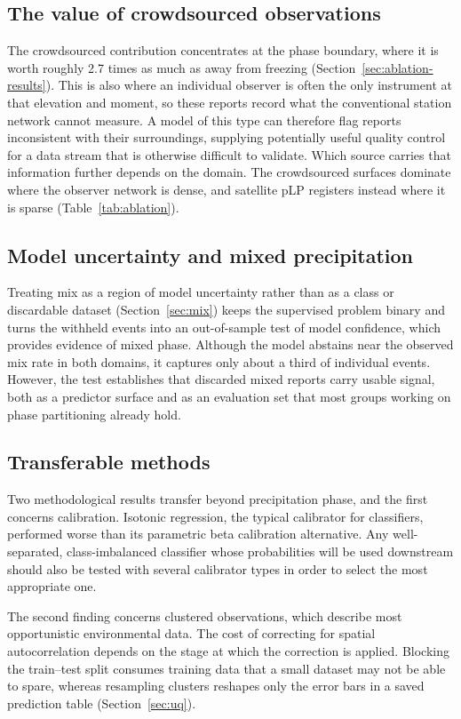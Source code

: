 \documentclass[twocol]{ametsocV6.1} %
\begin{document}
\subsection{The value of crowdsourced observations}
The crowdsourced contribution concentrates at the phase boundary, where
it is worth roughly 2.7 times as much as away from freezing
(Section~\ref{sec:ablation-results}). This is also where an individual
observer is often the only instrument at that elevation and moment, so
these reports record what the conventional station network cannot measure. 
A model of this type can therefore flag reports inconsistent with their 
surroundings, supplying potentially useful quality control for a data 
stream that is otherwise difficult to validate. Which source carries 
that information further depends on the domain. The
crowdsourced surfaces dominate where the observer network is dense, and
satellite pLP registers instead where it is sparse
(Table~\ref{tab:ablation}).

\subsection{Model uncertainty and mixed precipitation}
Treating mix as a region of model uncertainty rather than as a class or
discardable dataset (Section~\ref{sec:mix}) keeps the supervised problem binary
and turns the withheld events into an out-of-sample test of model
confidence, which provides evidence of mixed phase. Although the model abstains 
near the observed mix rate in both domains, it captures only about a third of individual
events. However, the test establishes that discarded mixed reports
carry usable signal, both as a predictor surface and as an evaluation
set that most groups working on phase partitioning already hold.

\subsection{Transferable methods}
Two methodological results transfer beyond precipitation phase, and the
first concerns calibration. Isotonic regression, the typical calibrator for classifiers, 
performed worse than its parametric beta calibration alternative. 
Any well-separated, class-imbalanced classifier whose probabilities 
will be used downstream should also be tested with several calibrator types in order 
to select the most appropriate one.

The second finding concerns clustered observations, which describe most
opportunistic environmental data. The cost of correcting for spatial
autocorrelation depends on the stage at which the correction is applied.
Blocking the train--test split consumes training data that a small dataset 
may not be able to spare, whereas resampling clusters 
reshapes only the error bars in a saved prediction table
(Section~\ref{sec:uq}).
\end{document}
